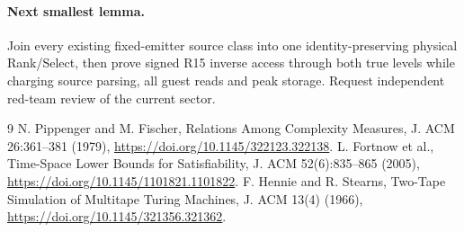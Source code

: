 \documentclass[11pt]{article}
\begin{document}
\paragraph{Next smallest lemma.}
Join every existing fixed-emitter source class
into one identity-preserving physical Rank/Select,
then prove signed R15 inverse access through
both true levels while charging source parsing,
all guest reads and peak storage. Request
independent red-team review of the current sector.
\begin{thebibliography}{9}
 N. Pippenger and M. Fischer,
Relations Among Complexity Measures,
J. ACM 26:361--381 (1979),
\url{https://doi.org/10.1145/322123.322138}.
 L. Fortnow et al.,
Time-Space Lower Bounds for Satisfiability,
J. ACM 52(6):835--865 (2005),
\url{https://doi.org/10.1145/1101821.1101822}.
 F. Hennie and R. Stearns,
Two-Tape Simulation of Multitape Turing Machines,
J. ACM 13(4) (1966),
\url{https://doi.org/10.1145/321356.321362}.
\end{thebibliography}
\end{document}
